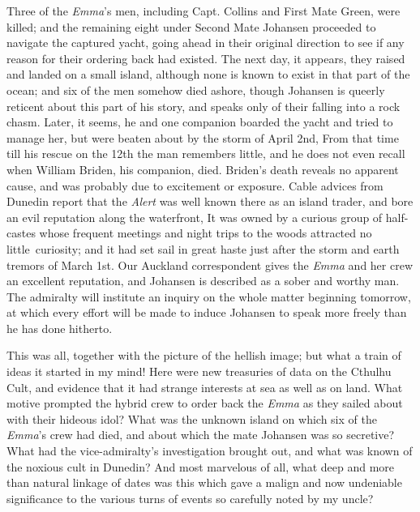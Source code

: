 Three of the \emph{Emma}'s men, including Capt. Collins and First Mate Green,
were killed; and the remaining eight under Second Mate Johansen
proceeded to navigate the captured yacht, going ahead in their original
direction to see if any reason for their ordering back had existed. The
next day, it appears, they raised and landed on a small island, although
none is known to exist in that part of the ocean; and six of the men
somehow died ashore, though Johansen is queerly reticent about this part
of his story, and speaks only of their falling into a rock chasm. Later,
it seems, he and one companion boarded the yacht and tried to manage
her, but were beaten about by the storm of April 2nd, From that time
till his rescue on the 12th the man remembers little, and he does not
even recall when William Briden, his companion, died. Briden's death
reveals no apparent cause, and was probably due to excitement or
exposure. Cable advices from Dunedin report that the \emph{Alert} was well
known there as an island trader, and bore an evil reputation along the
waterfront, It was owned by a curious group of half-castes whose
frequent meetings and night trips to the woods attracted no little\est\
 curiosity; and it had set sail in great haste just after the storm and
earth tremors of March 1st. Our Auckland correspondent gives the \emph{Emma}
and her crew an excellent reputation, and Johansen is described as a
sober and worthy man. The admiralty will institute an inquiry on the
whole matter beginning tomorrow, at which every effort will be made to
induce Johansen to speak more freely than he has done hitherto.

This was all, together with the picture of the hellish image; but what a
train of ideas it started in my mind! Here were new treasuries of data
on the Cthulhu Cult, and evidence that it had strange interests at sea
as well as on land. What motive prompted the hybrid crew to order back
the \emph{Emma} as they sailed about with their hideous idol? What was the
unknown island on which six of the \emph{Emma}'s crew had died, and about which
the mate Johansen was so secretive? What had the vice-admiralty's
investigation brought out, and what was known of the noxious cult in
Dunedin? And most marvelous of all, what deep and more than natural
linkage of dates was this which gave a malign and now undeniable
significance to the various turns of events so carefully noted by my
uncle?

